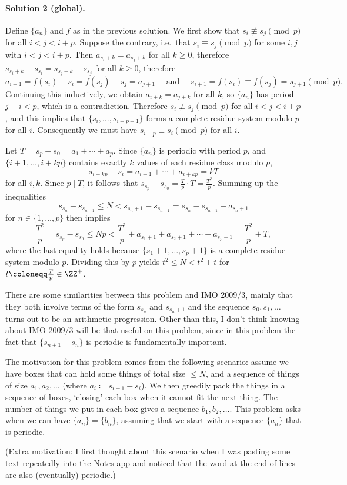 \documentclass[11pt]{scrartcl}
\begin{document}
\paragraph{Solution 2 (global).}
Define $\{a_n\}$ and $f$ as in the previous solution.
We first show that $s_i \not\equiv s_j\pmod p$ for all $i < j < i+p$.
Suppose the contrary, i.e.\ that $s_i \equiv s_j\pmod p$
for some $i,j$ with $i < j < i+p$.
Then $a_{s_i+k} = a_{s_j+k}$ for all $k \ge 0$,
therefore $s_{s_i+k} - s_{s_i} = s_{s_j+k} - s_{s_j}$ for all $k\ge 0$,
therefore
\[ a_{i+1} = f(s_i) - s_i = f(s_j) - s_j = a_{j+1}
  \quad\text{ and }\quad
  s_{i+1} = f(s_i)\equiv f(s_j) = s_{j+1}\pmod p. \]
Continuing this inductively, we obtain $a_{i+k} = a_{j+k}$ for all $k$,
so $\{a_n\}$ has period $j-i < p$, which is a contradiction.
Therefore $s_i \not\equiv s_j\pmod p$ for all $i < j < i+p$,
and this implies that $\{s_i, \dots, s_{i+p-1}\}$ forms a
complete residue system modulo $p$ for all $i$.
Consequently we must have $s_{i+p} \equiv s_i\pmod p$ for all $i$.

Let $T = s_p - s_0 = a_1 + \dotsb + a_p$.
Since $\{a_n\}$ is periodic with period $p$, and $\{i+1,\dots,i+kp\}$
contains exactly $k$ values of each residue class modulo $p$,
\[ s_{i+kp} - s_i = a_{i+1} + \dotsb + a_{i+kp} = kT \] for all $i,k$.
Since $p\mid T$, it follows that
$s_{s_p} - s_{s_0} = \frac Tp\cdot T = \frac{T^2}{p}$.
Summing up the inequalities
\[ s_{s_n} - s_{s_{n-1}}
  \le N < s_{s_n+1} - s_{s_{n-1}} = s_{s_n} - s_{s_{n-1}} + a_{s_n+1} \]
for $n\in\{1,\dots,p\}$ then implies
\[ \frac{T^2}{p} = s_{s_p} - s_{s_0} \le Np
  < \frac{T^2}{p} + a_{s_1+1} + a_{s_2+1} + \dotsb + a_{s_p+1}
  = \frac{T^2}{p} + T, \]
where the last equality holds because $\{s_1+1,\dots,s_p+1\}$
is a complete residue system modulo $p$.
Dividing this by $p$ yields $t^2\le N < t^2+t$ for
$t \coloneqq \frac Tp\in\ZZ^+$.

\begin{remark*}
  There are some similarities between this problem and IMO 2009/3,
  mainly that they both involve terms of the form $s_{s_n}$ and $s_{s_n+1}$
  and the sequence $s_0, s_1,\dots$ turns out to be an arithmetic progression.
  Other than this, I don't think knowing about IMO 2009/3 will
  be that useful on this problem, since in this problem the fact
  that $\{s_{n+1}-s_n\}$ is periodic is fundamentally important.

  The motivation for this problem comes from the following scenario:
  assume we have boxes that can hold some things of total size $\le N$,
  and a sequence of things of size $a_1, a_2, \dots$
  (where $a_i \coloneqq s_{i+1} - s_i$).
  We then greedily pack the things in a sequence of boxes,
  `closing' each box when it cannot fit the next thing.
  The number of things we put in each box gives a sequence $b_1, b_2, \dots$.
  This problem asks when we can have $\{a_n\} = \{b_n\}$,
  assuming that we start with a sequence $\{a_n\}$ that is periodic.

  (Extra motivation: I first thought about this scenario
  when I was pasting some text repeatedly into the Notes app and noticed that
  the word at the end of lines are also (eventually) periodic.)
\end{remark*}
\pagebreak
\end{document}

